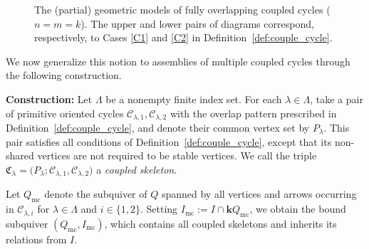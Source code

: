 \documentclass[11pt]{amsart}
\numberwithin{equation}{section}
\theoremstyle{definition}
\begin{document}
\begin{figure}[htbp]
\begin{center}
        \caption{The (partial) geometric models of fully overlapping coupled cycles ($n=m=k$). The upper and lower pairs of diagrams correspond, respectively, to Cases \ref{C1} and \ref{C2} in Definition~\ref{def:couple_cycle}.}

        \label{fig:geo-sing algebra}
    \end{center}
\end{figure}

We now generalize this notion to assemblies of multiple coupled cycles through the following construction.

\noindent \textbf{Construction:}
Let \(\Lambda\) be a nonempty finite index set. For each \(\lambda\in\Lambda\), take a pair of primitive oriented cycles \(\mathcal{C}_{\lambda,1}, \mathcal{C}_{\lambda,2}\) with the overlap pattern prescribed in Definition~\ref{def:couple_cycle}, and denote their common vertex set by \(P_\lambda\). This pair satisfies all conditions of Definition~\ref{def:couple_cycle}, except that its non-shared vertices are not required to be stable vertices. We call the triple \(\mathfrak C_\lambda = \bigl(P_\lambda;\mathcal{C}_{\lambda,1},\mathcal{C}_{\lambda,2}\bigr)\) a \emph{coupled skeleton}.

Let \(Q_{\mathrm{mc}}\) denote the subquiver of \(Q\) spanned by all vertices and arrows occurring in \(\mathcal C_{\lambda,i}\) for \(\lambda\in\Lambda\) and \(i\in\{1,2\}\). Setting \(I_{\mathrm{mc}}:=I\cap \mathbf{k}Q_{\mathrm{mc}}\), we obtain the bound subquiver \((Q_{\mathrm{mc}},I_{\mathrm{mc}})\), which contains all coupled skeletons and inherits its relations from \(I\).
\end{document}
